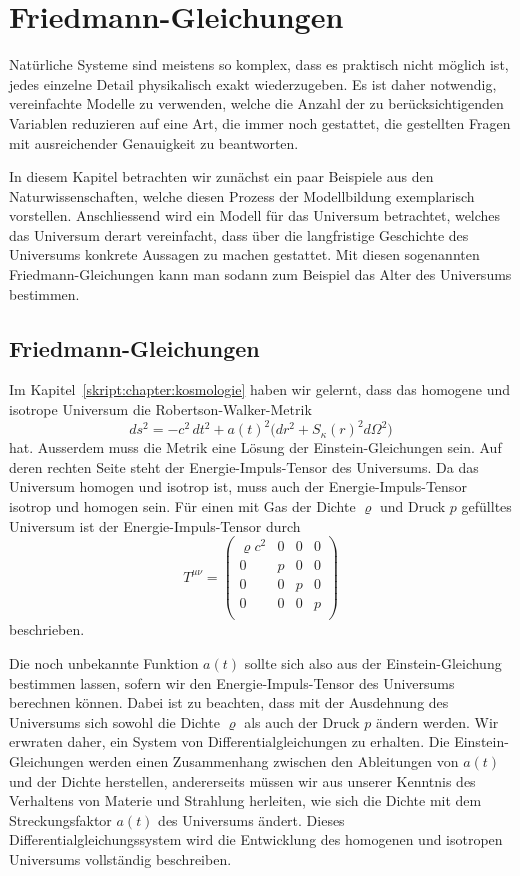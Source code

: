 %
%
%
\chapter{Friedmann-Gleichungen%
\label{skript:chapter:friedmann}}
\rhead{}
Natürliche Systeme sind meistens so komplex, dass es praktisch nicht
möglich ist, jedes einzelne Detail physikalisch exakt wiederzugeben.
Es ist daher notwendig, vereinfachte Modelle zu verwenden, welche 
die Anzahl der zu berücksichtigenden Variablen reduzieren auf eine
Art, die immer noch gestattet, die gestellten Fragen mit ausreichender
Genauigkeit zu beantworten.

In diesem Kapitel betrachten wir zunächst ein paar Beispiele aus den
Naturwissenschaften, welche diesen Prozess der Modellbildung exemplarisch
vorstellen.
Anschliessend wird ein Modell für das Universum betrachtet, welches
das Universum derart vereinfacht, dass über die langfristige
Geschichte des Universums konkrete Aussagen zu machen gestattet.
Mit diesen sogenannten Friedmann-Gleichungen kann man sodann zum
Beispiel das Alter des Universums bestimmen.

\section{Friedmann-Gleichungen}
Im Kapitel~\ref{skript:chapter:kosmologie} haben wir gelernt, dass
das homogene und isotrope Universum die Robertson-Walker-Metrik 
\[
ds^2
=
-c^2\,dt^2
+
a(t)^2\bigl(
dr^2 + S_\kappa(r)^2d\Omega^2
\bigr)
\]
hat.
Ausserdem muss die Metrik eine Lösung der Einstein-Gleichungen sein.
Auf deren rechten Seite steht der Energie-Impuls-Tensor des Universums.
Da das Universum homogen und isotrop ist, muss auch der Energie-Impuls-Tensor
isotrop und homogen sein.
Für einen mit Gas der Dichte $\varrho$ und Druck $p$ gefülltes Universum
ist der Energie-Impuls-Tensor durch
\[
T^{\mu\nu}
=
\begin{pmatrix}
\varrho c^2 & 0 & 0 & 0 \\
     0      & p & 0 & 0 \\
     0      & 0 & p & 0 \\
     0      & 0 & 0 & p \\
\end{pmatrix}
\]
beschrieben.

Die noch unbekannte Funktion $a(t)$ sollte sich also aus der
Einstein-Gleichung bestimmen lassen, sofern wir den Energie-Impuls-Tensor
des Universums berechnen können.
Dabei ist zu beachten, dass mit der Ausdehnung des Universums sich sowohl
die Dichte $\varrho$ als auch der Druck $p$ ändern werden.
Wir erwraten daher, ein System von Differentialgleichungen zu erhalten.
Die Einstein-Gleichungen werden einen Zusammenhang zwischen den 
Ableitungen von $a(t)$ und der Dichte herstellen,
andererseits müssen wir aus unserer Kenntnis des Verhaltens von
Materie und Strahlung herleiten, wie sich die Dichte mit dem
Streckungsfaktor  $a(t)$ des Universums ändert.
Dieses Differentialgleichungssystem wird die Entwicklung des homogenen
und isotropen Universums vollständig beschreiben.


